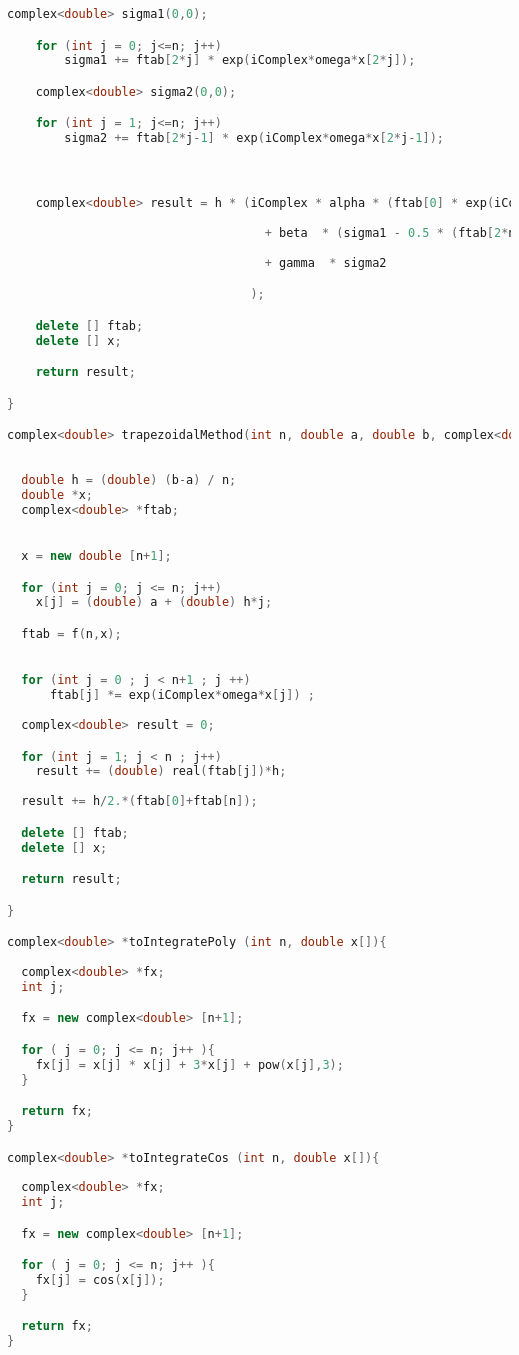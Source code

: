 \begin{lstlisting}[language=C++]
    complex<double> sigma1(0,0);

    for (int j = 0; j<=n; j++)
        sigma1 += ftab[2*j] * exp(iComplex*omega*x[2*j]);

    complex<double> sigma2(0,0);

    for (int j = 1; j<=n; j++)
        sigma2 += ftab[2*j-1] * exp(iComplex*omega*x[2*j-1]);



    complex<double> result = h * (iComplex * alpha * (ftab[0] * exp(iComplex*omega*x[0]) - ftab[2*n] * exp(iComplex*omega*x[2*n])) 
                                   
                                    + beta  * (sigma1 - 0.5 * (ftab[2*n] * exp(iComplex*omega*x[2*n]) + ftab[0] * exp(iComplex*omega*x[0])))
                                   
                                    + gamma  * sigma2

                                  );

    delete [] ftab;
    delete [] x;

    return result;

}

complex<double> trapezoidalMethod(int n, double a, double b, complex<double> *f(int n , double x[]), double omega){
  
      
  double h = (double) (b-a) / n;
  double *x;
  complex<double> *ftab;

 
  x = new double [n+1];

  for (int j = 0; j <= n; j++)
    x[j] = (double) a + (double) h*j; 

  ftab = f(n,x); 

               
  for (int j = 0 ; j < n+1 ; j ++)                              
      ftab[j] *= exp(iComplex*omega*x[j]) ;
    
  complex<double> result = 0;

  for (int j = 1; j < n ; j++)
    result += (double) real(ftab[j])*h;
  
  result += h/2.*(ftab[0]+ftab[n]);

  delete [] ftab;
  delete [] x;

  return result;

}

complex<double> *toIntegratePoly (int n, double x[]){
  
  complex<double> *fx;
  int j;

  fx = new complex<double> [n+1];

  for ( j = 0; j <= n; j++ ){
    fx[j] = x[j] * x[j] + 3*x[j] + pow(x[j],3);
  }

  return fx;
}

complex<double> *toIntegrateCos (int n, double x[]){
  
  complex<double> *fx;
  int j;

  fx = new complex<double> [n+1];

  for ( j = 0; j <= n; j++ ){
    fx[j] = cos(x[j]);
  }

  return fx;
}


\end{lstlisting}

